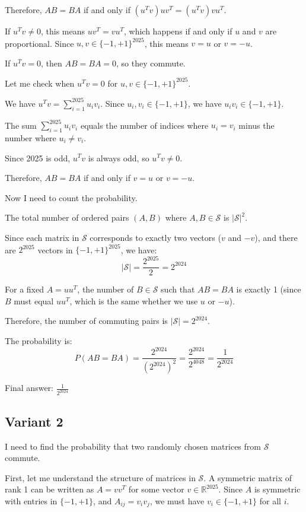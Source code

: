 \documentclass[12pt,a4paper]{article}
\theoremstyle{definition}
\begin{document}
    Therefore, $AB = BA$ if and only if $(u^T v) uv^T = (u^T v) vu^T$.

    If $u^T v \neq 0$, this means $uv^T = vu^T$, which happens if and only if $u$ and $v$ are proportional. Since $u, v \in \{-1, +1\}^{2025}$, this means $v = u$ or $v = -u$.

    If $u^T v = 0$, then $AB = BA = 0$, so they commute.

    Let me check when $u^T v = 0$ for $u, v \in \{-1, +1\}^{2025}$.

    We have $u^T v = \sum_{i=1}^{2025} u_i v_i$. Since $u_i, v_i \in \{-1, +1\}$, we have $u_i v_i \in \{-1, +1\}$.

    The sum $\sum_{i=1}^{2025} u_i v_i$ equals the number of indices where $u_i = v_i$ minus the number where $u_i \neq v_i$.

    Since 2025 is odd, $u^T v$ is always odd, so $u^T v \neq 0$.

    Therefore, $AB = BA$ if and only if $v = u$ or $v = -u$.

    Now I need to count the probability.

    The total number of ordered pairs $(A, B)$ where $A, B \in \mathcal{S}$ is $|\mathcal{S}|^2$.

    Since each matrix in $\mathcal{S}$ corresponds to exactly two vectors ($v$ and $-v$), and there are $2^{2025}$ vectors in $\{-1, +1\}^{2025}$, we have:
    $$|\mathcal{S}| = \frac{2^{2025}}{2} = 2^{2024}$$

    For a fixed $A = uu^T$, the number of $B \in \mathcal{S}$ such that $AB = BA$ is exactly 1 (since $B$ must equal $uu^T$, which is the same whether we use $u$ or $-u$).

    Therefore, the number of commuting pairs is $|\mathcal{S}| = 2^{2024}$.

    The probability is:
    $$P(AB = BA) = \frac{2^{2024}}{(2^{2024})^2} = \frac{2^{2024}}{2^{4048}} = \frac{1}{2^{2024}}$$

    Final answer: $\frac{1}{2^{2024}}$
\subsection{Variant 2}
    I need to find the probability that two randomly chosen matrices from $\mathcal{S}$ commute.

    First, let me understand the structure of matrices in $\mathcal{S}$. A symmetric matrix of rank 1 can be written as $A = vv^T$ for some vector $v \in \mathbb{R}^{2025}$. Since $A$ is symmetric with entries in $\{-1, +1\}$, and $A_{ij} = v_i v_j$, we must have $v_i \in \{-1, +1\}$ for all $i$.
\end{document}
